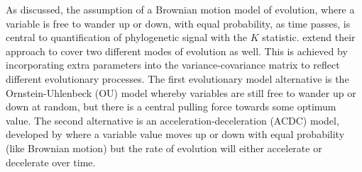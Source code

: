 As discussed, the assumption of a Brownian motion model of evolution, where a variable is free to wander up or down, with equal probability, as time passes, is central to quantification of phylogenetic signal with the \(K\) statistic. \textcite[pp.~726--727]{blomberg_testing_2003} extend their approach to cover two different modes of evolution as well. This is achieved by incorporating extra parameters into the variance-covariance matrix to reflect different evolutionary processes. The first evolutionary model alternative is the Ornstein-Uhlenbeck (OU) model \autocites{felsenstein_phylogenies_1988}{garland_phylogenetic_1993}{hansen_translating_1996}{lavin_morphometrics_2008} whereby variables are still free to wander up or down at random, but there is a central pulling force towards some optimum value. The second alternative is an acceleration-deceleration (ACDC) model, developed by \textcite{blomberg_testing_2003} where a variable value moves up or down with equal probability (like Brownian motion) but the rate of evolution will either accelerate or decelerate over time.

